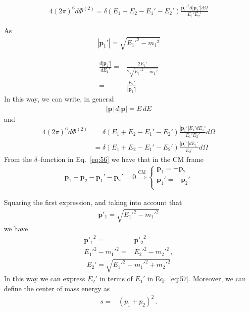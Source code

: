 \begin{align}
  4(2\pi)^6d\Phi^{(2)}=\delta(E_1+E_2-E_1'-E_2')
  \frac{{\mathbf{p}_1'}^2d|\mathbf{p}_1'|d\Omega}{E_{1}'E_{2}'}
\end{align}

As
\begin{align}
  |\mathbf{p}_1'|=\sqrt{{E_1'}^2-{m_1}^2}
\end{align}

\begin{align}
  \frac{d|\mathbf{p}_1'|}{dE_1'}=&\frac{2E_1'}{2\sqrt{{E_1'}^2-{m_1}^2}}\nonumber\\
  =&\frac{E_1'}{|\mathbf{p}_1'|}
\end{align}
In this way, we can write, in general
\begin{align}
 |\mathbf{p}|\, d|\mathbf{p}|=E\,dE
\end{align}
and
\begin{align}
\label{eq:57}
 4(2\pi)^6 d\Phi^{(2)}&=\delta(E_1+E_2-E_1'-E_2')
\frac{|\mathbf{p}_1'|E_1'dE_1'}{E_{1}'E_{2}'}d\Omega\nonumber\\
  &=\delta(E_1+E_2-E_1'-E_2')
\frac{|\mathbf{p}_1'|dE_1'}{E_{2}'}d\Omega
\end{align}
From the $\delta$--function in Eq.~\eqref{eq:56} we have that in the CM frame
\begin{align}
  \mathbf{p}_1+\mathbf{p}_2-\mathbf{p}_1'-\mathbf{p}_2'=0 \overset{\text{CM}}{\Rightarrow}
  \begin{cases}
    \mathbf{p}_1=-\mathbf{p}_2\\
    \mathbf{p}_1'=-\mathbf{p}_2'\\
  \end{cases}
\end{align}

Squaring the first expression, and taking into account that
\begin{align}
  \label{eq:58}
  {\mathbf{p}'_1}= \sqrt{{E_1'}^2-{m_1'}^2}
\end{align}
we have
\begin{align}
  {\mathbf{p}'_1}^2=&{\mathbf{p}'_2}^2\nonumber\\
  {E_1'}^2-{m_1'}^2=&  {E_2'}^2-{m_2'}^2\,,
\end{align}
\begin{align}
\label{eq:59}
  E_2'=\sqrt{{E_1'}^2-{m_1'}^2+{m_2'}^2}
\end{align}
In this way we can express $E_2'$ in terms of $E_1'$ in Eq.~\eqref{eq:57}.
Moreover, we can define the center of mass energy as
\begin{align}
\label{eq:smv}
  s=&\left( p_1+p_2 \right)^2\,.
\end{align}

